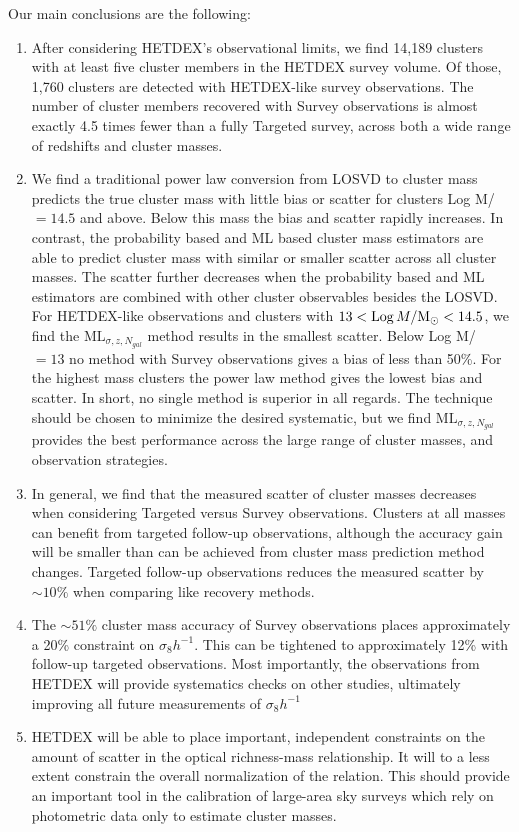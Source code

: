 \documentclass[fleqn,usenatbib]{mnras}
\begin{document}
Our main conclusions are the following:
\begin{enumerate}
	\item After considering HETDEX's observational limits, we find 14,189 clusters with at least five cluster members in the HETDEX survey volume. Of those, 1,760 clusters are detected with HETDEX-like survey observations. The number of cluster members recovered with Survey observations is almost exactly 4.5 times fewer than a fully Targeted survey, across both a wide range of redshifts and cluster masses.

	\item We find a traditional power law conversion from LOSVD to cluster mass predicts the true cluster mass with little bias or scatter for clusters Log M/\Msol\ $=14.5$ and above. Below this mass the bias and scatter rapidly increases. In contrast, the probability based and ML based cluster mass estimators are able to predict cluster mass with similar or smaller scatter across all cluster masses. The scatter further decreases when the probability based and ML estimators are combined with other cluster observables besides the LOSVD. For HETDEX-like observations and clusters with $13 < \mathrm{Log}\, M/\hbox{$\mathrm{M}_\odot$} <14.5$, we find the $\mathrm{ML}_{\sigma, z, N_{gal}}$ method results in the smallest scatter. Below Log M/\Msol\ $=13$ no method with Survey observations gives a bias of less than 50\%. For the highest mass clusters the power law method gives the lowest bias and scatter. In short, no single method is superior in all regards. The technique should be chosen to minimize the desired systematic, but we find $\mathrm{ML}_{\sigma, z, N_{gal}}$ provides the best performance across the large range of cluster masses, and observation strategies.

	\item In general, we find that the measured scatter of cluster masses decreases when considering Targeted versus Survey observations. Clusters at all masses can benefit from targeted follow-up observations, although the accuracy gain will be smaller than can be achieved from cluster mass prediction method changes. Targeted follow-up observations reduces the measured scatter by $\sim10\%$ when comparing like recovery methods.

	\item The $\sim51\%$ cluster mass accuracy of Survey observations places approximately a 20\% constraint on $\sigma_8 h^{-1}$. This can be tightened to approximately 12\% with follow-up targeted observations. Most importantly, the observations from HETDEX will provide systematics checks on other studies, ultimately improving all future measurements of $\sigma_8 h^{-1}$

	\item HETDEX will be able to place important, independent constraints on the amount of scatter in the optical richness-mass relationship. It will to a less extent constrain the overall normalization of the relation. This should provide an important tool in the calibration of large-area sky surveys which rely on photometric data only to estimate cluster masses.
\end{enumerate}
\end{document}
